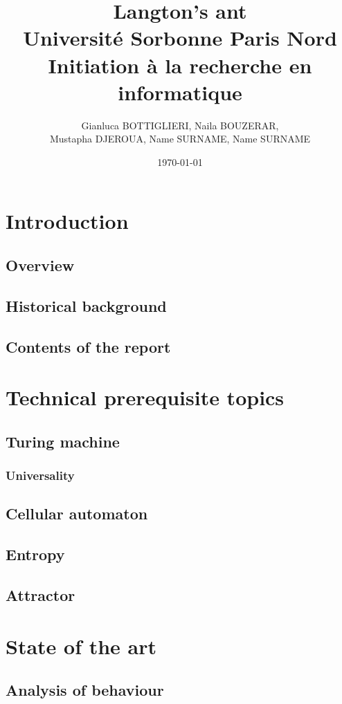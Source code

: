 \documentclass{article}
\title{Langton's ant \\  \LARGE Université Sorbonne Paris Nord \\ \large Initiation à la recherche en informatique}
\author{Gianluca BOTTIGLIERI, Naila BOUZERAR, \\ Mustapha DJEROUA, Name SURNAME, Name SURNAME}
\date{\today}
\begin{document}
\maketitle

\newpage

\tableofcontents

\newpage

\tableofcontents

\section{Introduction}
\subsection{Overview}
\subsection{Historical background}
\subsection{Contents of the report}

\section{Technical prerequisite topics}
\subsection{Turing machine}
\subsubsection{Universality}
\subsection{Cellular automaton}
\subsection{Entropy}
\subsection{Attractor}

\section{State of the art}
\subsection{Analysis of behaviour}
\end{document}

